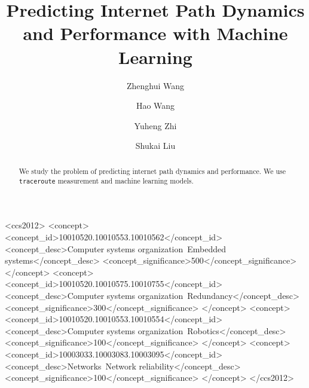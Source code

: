 \documentclass[sigconf]{acmart}
\begin{document}
\title{Predicting Internet Path Dynamics and Performance with Machine Learning}


\author{Zhenghui Wang}

\author{Hao Wang}

\author{Yuheng Zhi}

\author{Shukai Liu}

\renewcommand{\shortauthors}{CN Group}


\begin{abstract}
We study the problem of predicting internet path dynamics and performance. We use \texttt{traceroute} measurement and machine learning models.
\end{abstract}

%
%
\begin{CCSXML}
<ccs2012>
 <concept>
  <concept_id>10010520.10010553.10010562</concept_id>
  <concept_desc>Computer systems organization~Embedded systems</concept_desc>
  <concept_significance>500</concept_significance>
 </concept>
 <concept>
  <concept_id>10010520.10010575.10010755</concept_id>
  <concept_desc>Computer systems organization~Redundancy</concept_desc>
  <concept_significance>300</concept_significance>
 </concept>
 <concept>
  <concept_id>10010520.10010553.10010554</concept_id>
  <concept_desc>Computer systems organization~Robotics</concept_desc>
  <concept_significance>100</concept_significance>
 </concept>
 <concept>
  <concept_id>10003033.10003083.10003095</concept_id>
  <concept_desc>Networks~Network reliability</concept_desc>
  <concept_significance>100</concept_significance>
 </concept>
</ccs2012>  
\end{CCSXML}
\end{document}

